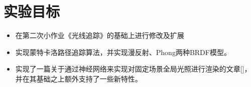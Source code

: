 ﻿\section {实验目标}
\begin{itemize}[noitemsep]
    \item 在第二次小作业《光线追踪》的基础上进行修改及扩展
    \item 实现蒙特卡洛路径追踪算法，并实现漫反射、Phong两种BRDF模型。
    \item 实现了一篇关于通过神经网络来实现对固定场景全局光照进行渲染的文章[\cite{ren2013global}]，并在其基础之上额外支持了一些新特性。
\end{itemize}
